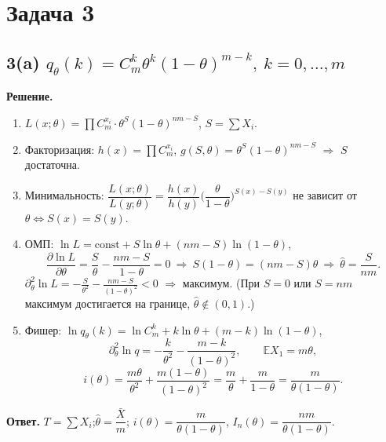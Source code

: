 \documentclass[12pt,a4paper]{article}
\newcommand{\E}{\mathbb{E}}
\newcommand{\sol}{\par\noindent\textbf{Решение.} }
\newcommand{\ans}{\par\smallskip\noindent\textbf{Ответ.} }
\begin{document}
\section*{Задача 3}

\subsection*{3(a) \quad $q_\theta(k)=C_m^k\theta^k(1-\theta)^{m-k},\ k=0,\dots,m$}
\sol
\begin{enumerate}
  \item $L(x;\theta)=\prod C_m^{x_i}\cdot\theta^{S}(1-\theta)^{nm-S}$,
        $S=\sum X_i$.
  \item Факторизация: $h(x)=\prod C_m^{x_i}$,
        $g(S,\theta)=\theta^S(1-\theta)^{nm-S}$ $\Rightarrow$ $S$ достаточна.
  \item Минимальность: $\dfrac{L(x;\theta)}{L(y;\theta)}
        =\dfrac{h(x)}{h(y)}\Big(\dfrac{\theta}{1-\theta}\Big)^{S(x)-S(y)}$
        не зависит от $\theta\iff S(x)=S(y)$.
  \item ОМП: $\ln L=\text{const}+S\ln\theta+(nm-S)\ln(1-\theta)$,
  \[
    \frac{\partial\ln L}{\partial\theta}=\frac S\theta-\frac{nm-S}{1-\theta}=0
    \ \Rightarrow\ S(1-\theta)=(nm-S)\theta\ \Rightarrow\ \hat\theta=\frac{S}{nm}.
  \]
  $\partial^2_\theta\ln L=-\frac S{\theta^2}-\frac{nm-S}{(1-\theta)^2}<0$
  $\Rightarrow$ максимум. (При $S=0$ или $S=nm$ максимум достигается на
  границе, $\hat\theta\notin(0,1)$.)
  \item Фишер: $\ln q_\theta(k)=\ln C_m^k+k\ln\theta+(m-k)\ln(1-\theta)$,
  \[
    \partial^2_\theta\ln q=-\frac k{\theta^2}-\frac{m-k}{(1-\theta)^2},
    \qquad \E X_1=m\theta,
  \]
  \[
    i(\theta)=\frac{m\theta}{\theta^2}+\frac{m(1-\theta)}{(1-\theta)^2}
    =\frac m\theta+\frac m{1-\theta}=\frac{m}{\theta(1-\theta)}.
  \]
\end{enumerate}
\ans $T=\sum X_i$;\quad $\hat\theta=\dfrac{\bar X}{m}$;\quad
$i(\theta)=\dfrac{m}{\theta(1-\theta)}$, $I_n(\theta)=\dfrac{nm}{\theta(1-\theta)}$.

\end{document}
